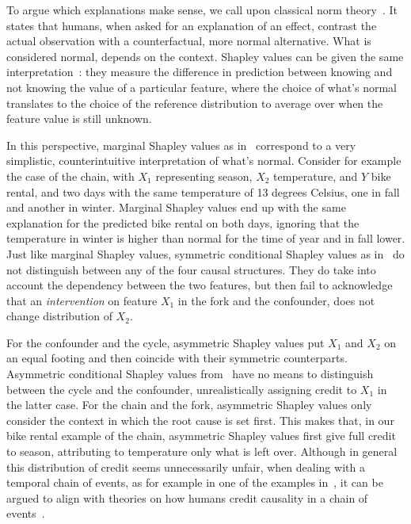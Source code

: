 \documentclass{article}
\begin{document}
To argue which explanations make sense, we call upon classical norm theory~\cite{kahneman1986norm}. It states that humans, when asked for an explanation of an effect, contrast the actual observation with a counterfactual, more normal alternative. What is considered normal, depends on the context. Shapley values can be given the same interpretation~\cite{merrick2019explanation}: they measure the difference in prediction between knowing and not knowing the value of a particular feature, where the choice of what's normal translates to the choice of the reference distribution to average over when the feature value is still unknown.

In this perspective, marginal Shapley values as in~\cite{datta2016algorithmic,janzing2019feature,lundberg2020local} correspond to a very simplistic, counterintuitive interpretation of what's normal. Consider for example the case of the chain, with $X_1$ representing season, $X_2$ temperature, and $Y$ bike rental, and two days with the same temperature of 13 degrees Celsius, one in fall and another in winter. Marginal Shapley values end up with the same explanation for the predicted bike rental on both days, ignoring that the temperature in winter is higher than normal for the time of year and in fall lower. Just like marginal Shapley values, symmetric conditional Shapley values as in~\cite{aas2019explaining} do not distinguish between any of the four causal structures. They do take into account the dependency between the two features, but then fail to acknowledge that an {\em intervention} on feature $X_1$ in the fork and the confounder, does not change distribution of $X_2$.

For the confounder and the cycle, asymmetric Shapley values put $X_1$ and $X_2$ on an equal footing and then coincide with their symmetric counterparts. Asymmetric conditional Shapley values from~\cite{frye2019asymmetric} have no means to distinguish between the cycle and the confounder, unrealistically assigning credit to $X_1$ in the latter case. For the chain and the fork, asymmetric Shapley values only consider the context in which the root cause is set first. This makes that, in our bike rental example of the chain, asymmetric Shapley values first give full credit to season, attributing to temperature only what is left over. Although in general this distribution of credit seems unnecessarily unfair, when dealing with a temporal chain of events, as for example in one of the examples in~\cite{frye2019asymmetric}, it can be argued to align with theories on how humans credit causality in a chain of events~\cite{spellman1997crediting}.
\end{document}
